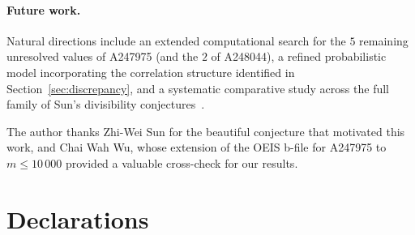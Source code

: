 \documentclass[pdflatex,sn-mathphys-num,Numbered]{sn-jnl}
\theoremstyle{thmstyleone}
\theoremstyle{thmstylethree}
\theoremstyle{thmstyletwo}
\numberwithin{equation}{section}
\begin{document}
\paragraph{Future work.}
Natural directions include an extended computational
search for the $5$ remaining unresolved values of A247975
(and the $2$ of A248044), a refined probabilistic
model incorporating the correlation structure identified in
Section~\ref{sec:discrepancy},
and a systematic comparative study across the full family of
Sun's divisibility conjectures~\cite{Sun2019}.

\backmatter


The author thanks Zhi-Wei Sun for the beautiful conjecture that
motivated this work, and Chai Wah Wu, whose extension of the OEIS
b-file for A247975 to $m \leq 10\,000$ provided a valuable
cross-check for our results.

\section*{Declarations}
\end{document}
